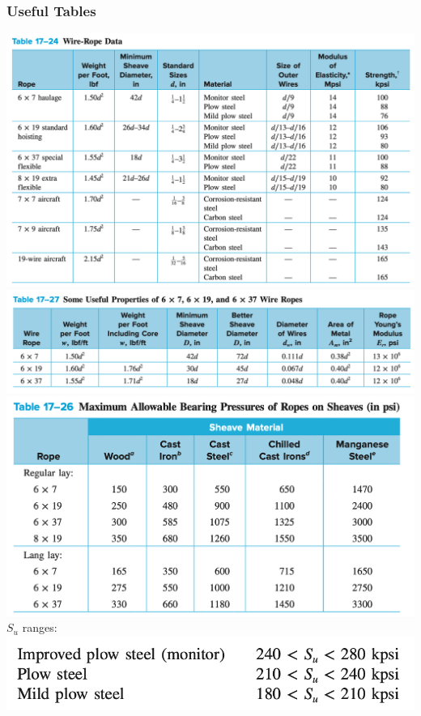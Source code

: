 \documentclass[11pt, fleqn]{article}
\begin{document}
\subsubsection{Useful Tables}
\includegraphics[scale=0.6]{Belts/wire-rope_data.png}\\
\includegraphics[scale=0.6]{Belts/17-27.png}\\
\includegraphics[scale=0.6]{Belts/max-allowable-pressure.png}\\
$S_u$ ranges:\\
\includegraphics[scale=0.6]{Belts/S_u.png}\\
\end{document}
